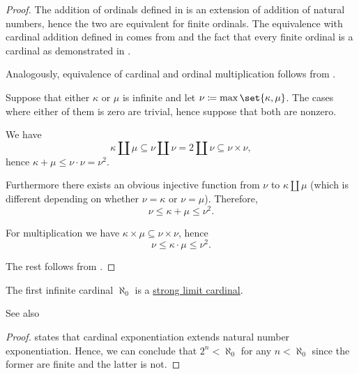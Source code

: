 \begin{proof}
   The addition of ordinals defined in  is an extension of addition of natural numbers, hence the two are equivalent for finite ordinals. The equivalence with cardinal addition defined in  comes from  and the fact that every finite ordinal is a cardinal as demonstrated in .

  Analogously, equivalence of cardinal and ordinal multiplication follows from .

   Suppose that either \( \kappa \) or \( \mu \) is infinite and let \( \nu \coloneqq \max\set{ \kappa, \mu } \). The cases where either of them is zero are trivial, hence suppose that both are nonzero.

  We have
  \begin{equation*}
    \kappa \amalg \mu \subseteq \nu \amalg \nu = 2 \amalg \nu \subseteq \nu \times \nu,
  \end{equation*}
  hence \( \kappa + \mu \leq \nu \cdot \nu = \nu^2 \).

  Furthermore there exists an obvious injective function from \( \nu \) to \( \kappa \amalg \mu \) (which is different depending on whether \( \nu = \kappa \) or \( \nu = \mu \)). Therefore,
  \begin{equation*}
    \nu \leq \kappa + \mu \leq \nu^2.
  \end{equation*}

  For multiplication we have \( \kappa \times \mu \subseteq \nu \times \nu \), hence
  \begin{equation*}
    \nu \leq \kappa \cdot \mu \leq \nu^2.
  \end{equation*}

  The rest follows from .
\end{proof}

\begin{corollary}\label{thm:aleph_zero_is_strong_limit}
  The first infinite cardinal \( \aleph_0 \) is a \hyperref[def:successor_and_limit_cardinal/strong_limit]{strong limit cardinal}.
\end{corollary}
\begin{comments}
  \item See also 
\end{comments}
\begin{proof}
   states that cardinal exponentiation extends natural number exponentiation. Hence, we can conclude that \( 2^n < \aleph_0 \) for any \( n < \aleph_0 \) since the former are finite and the latter is not.
\end{proof}

